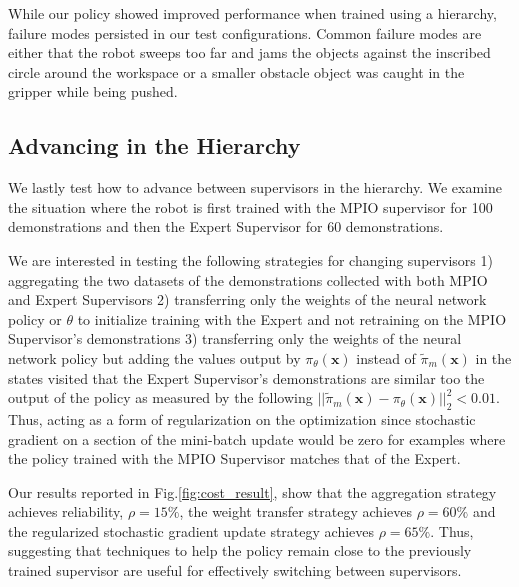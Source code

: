 \documentclass[10pt, conference]{ieeeconf}      %
\newcommand{\bx}{\mathbf{x}}
\begin{document}
 While our policy showed improved performance when trained using a hierarchy, failure modes persisted in our test
configurations. Common failure modes are either that the robot
sweeps too far and jams the objects against the inscribed circle around the workspace or a smaller obstacle object was caught in the gripper while being pushed.

\subsection{Advancing in the Hierarchy}
We lastly test how to advance between supervisors in the hierarchy. We examine the situation where the robot is first trained with the MPIO supervisor for 100 demonstrations and then the Expert Supervisor for 60 demonstrations. 

We are interested in testing the following strategies for changing supervisors 1) aggregating the two datasets of the demonstrations collected with both MPIO and Expert Supervisors 2)
transferring only the weights of the neural network policy or $\theta$  to initialize training with the Expert and not retraining on the MPIO Supervisor's demonstrations 3) transferring only the weights of the neural network policy but
adding the values output by $\pi_\theta(\bx)$  instead of $\tilde{\pi}_m(\bx)$ in the states visited that the
Expert Supervisor's demonstrations are similar too the output of the policy as measured by the following $||\tilde{\pi}_m(\bx) - \pi_\theta(\bx)||^2_2
< 0.01$. Thus, acting as a form of regularization on the optimization since stochastic gradient on a section of the mini-batch update would be zero for examples where the policy trained with the MPIO Supervisor matches that of the Expert. 

 Our results reported in Fig.\ref{fig:cost_result}, show that the aggregation strategy achieves reliability, $\rho=15\%$, the weight transfer strategy achieves $\rho = 60\%$ and the regularized stochastic gradient update strategy achieves $\rho=65\%$. Thus, suggesting that techniques to help the policy remain close to the previously trained supervisor are useful for effectively switching between supervisors.
\end{document}
